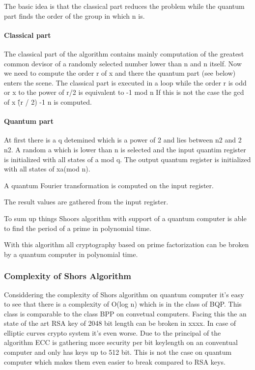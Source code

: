 The basic idea is that the classical part reduces the problem while the quantum part finds the order of the group in which n is. 
\paragraph{Classical part}
The classical part of the algorithm contains mainly computation of the greatest common devisor of a randomly selected number lower than n and n itself. Now we need to compute the order r of x and there the quantum part (see below) enters the scene. The classical part is executed in a loop while the order r is odd or x to the power of r/2 is equivalent to -1 mod n   
If this is not the case the gcd of x \^ (r / 2) -1 n is computed.
\paragraph{Quantum part}
At first there is a q detemined which is a power of 2 and lies between n2 and 2 n2. 
A random a which is lower than n is selected and the input quantim register is initialized with all states of a mod q. 
The output quantum register is initialized with all states of xa(mod n). 

A quantum Fourier transformation is computed on the input register. 

The result values are gathered from the input register. 

To sum up things Shoors algorithm with support of a quantum computer is able to find the period of a prime in polynomial time. 

With this algorithm all cryptography based on prime factorization can be broken by a quantum computer in polynomial time. 

\subsubsection{Complexity of Shors Algorithm} 
Considdering the complexity of Shors algorithm on quantum computer it's easy to see that there is a complexity of O(log n) which is in the class of BQP. This class is comparable to the class BPP on convetual computers. Facing this the an state of the art RSA key of 2048 bit length can be broken in xxxx. In case of elliptic curves crypto system it's even worse. Due to the principal of the algorithm ECC is gathering more security per bit keylength on an conventual computer and only has keys up to 512 bit. This is not the case on quantum computer which makes them even easier to break compared to RSA keys.

